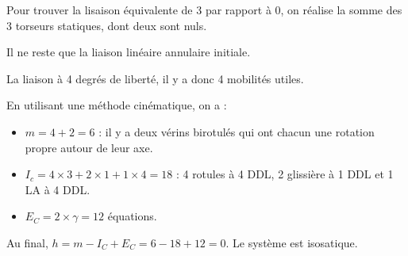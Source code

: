 \ifprof
\begin{corrige}
Pour trouver la lisaison équivalente de 3 par rapport à 0, on réalise la somme des 3 torseurs statiques, dont deux sont nuls. 

Il ne reste que la liaison linéaire annulaire initiale.

La liaison à 4 degrés de liberté, il y a donc 4 mobilités utiles. 
\end{corrige}
\else
\fi


\ifprof
\begin{corrige}
En utilisant une méthode cinématique, on a : 
\begin{itemize}
\item $m =4 + 2 =6$ : il y a deux vérins birotulés qui ont chacun une rotation propre autour de leur axe. 
\item $I_c = 4 \times 3 + 2 \times 1 + 1\times 4 = 18$ : 4 rotules à 4 DDL, 2 glissière à 1 DDL et 1 LA  à 4 DDL. 
\item $E_C = 2 \times \gamma =12$ équations.
\end{itemize}
Au final, 
$h=m-I_C+E_C = 6  - 18  +12 = 0$. Le système est isosatique.
\end{corrige}
\else
\fi



